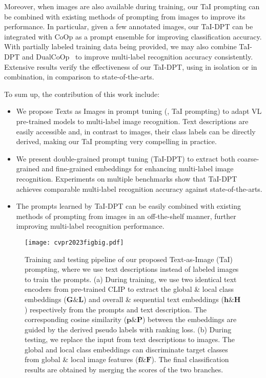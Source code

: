 \documentclass[10pt,twocolumn,letterpaper]{article}
\begin{document}
Moreover, when images are also available during training, our TaI prompting can be combined with existing methods of prompting from images to improve its performance. 
In particular, given a few annotated images, our TaI-DPT can be integrated with CoOp as a prompt ensemble for improving classification accuracy.
With partially labeled training data being provided, we may also combine TaI-DPT and DualCoOp~\cite{dualcoop} to improve multi-label recognition accuracy consistently.
Extensive results verify the effectiveness of our TaI-DPT, using in isolation or in combination, in comparison to state-of-the-arts.


To sum up, the contribution of this work include:
\begin{itemize}
\setlength{\itemsep}{0pt}
\setlength{\parsep}{0pt}
\setlength{\parskip}{0pt}
\item We propose Texts as Images in prompt tuning (\ie, TaI prompting) to adapt VL pre-trained models to multi-label image recognition.
Text descriptions are easily accessible and, in contrast to images, their class labels can be directly derived, making our TaI prompting very compelling in practice.
\item We present double-grained prompt tuning (\ie TaI-DPT) to extract both coarse-grained and fine-grained embeddings
for enhancing multi-label image recognition. Experiments on multiple benchmarks show that TaI-DPT achieves comparable multi-label recognition accuracy against state-of-the-arts.
\item  The prompts learned by TaI-DPT can be easily combined with existing methods of prompting from images in an off-the-shelf manner, further improving multi-label recognition performance.
\end{itemize}


\begin{figure*}
  \centering
\texttt{[image: cvpr2023figbig.pdf]}
  \vspace{-7.5mm}
  \caption{Training and testing pipeline of our proposed Text-as-Image (TaI) prompting, where we use text descriptions instead of labeled images to train the prompts. (a) During training, we use two identical text encoders from pre-trained CLIP to extract the global \& local class embeddings ($\mathbf{G} \& \mathbf{L}$) and overall \& sequential text embeddings ($\mathbf{h} \& \mathbf{H}$) respectively from the prompts and text description. The corresponding cosine similarity ($\mathbf{p} \& \mathbf{P}$) between the embeddings are guided by the derived pseudo labels with ranking loss. (b) During testing, we replace the input from text descriptions to images. The global and local class embeddings can discriminate target classes from global \& local image features ($\mathbf{f} \& \mathbf{F}$). The final classification results are obtained by merging the scores of the two branches.}
  \label{fig:pipeline} \vskip -0.1in
\end{figure*}
\end{document}
